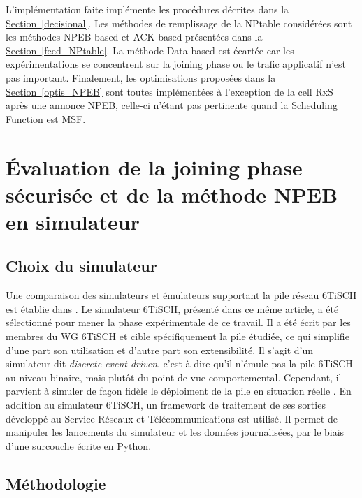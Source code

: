 \documentclass[]{report}
\newcommand{\wordlink}[2]{\hyperref[#2]{#1~\ref{#2}}}
\begin{document}
L'implémentation faite implémente les procédures décrites dans la \wordlink{Section}{decisional}. Les méthodes de remplissage de la NPtable considérées sont les méthodes NPEB-based et ACK-based présentées dans la \wordlink{Section}{feed_NPtable}. La méthode Data-based est écartée car les expérimentations se concentrent sur la joining phase ou le trafic applicatif n'est pas important. Finalement, les optimisations proposées dans la \wordlink{Section}{optis_NPEB} sont toutes implémentées à l'exception de la cell RxS après une annonce NPEB, celle-ci n'étant pas pertinente quand la Scheduling Function est MSF.


\chapter{Évaluation de la joining phase sécurisée et de la méthode NPEB en simulateur}
\label{chap_exp}
\newpage

\section{Choix du simulateur}
\label{choice_sim}

Une comparaison des simulateurs et émulateurs supportant la pile réseau 6TiSCH est établie dans \cite{simulating-6TiSCH}. Le simulateur 6TiSCH, présenté dans ce même article, a été sélectionné pour mener la phase expérimentale de ce travail. Il a été écrit par les membres du WG 6TiSCH et cible spécifiquement la pile étudiée, ce qui simplifie d'une part son utilisation et d'autre part son extensibilité. Il s'agit d'un simulateur dit \textit{discrete event-driven}, c'est-à-dire qu'il n'émule pas la pile 6TiSCH au niveau binaire, mais plutôt du point de vue comportemental. Cependant, il parvient à simuler de façon fidèle le déploiment de la pile en situation réelle \cite{simulating-6TiSCH}. En addition au simulateur 6TiSCH, un framework de traitement de ses sorties développé au Service Réseaux et Télécommunications est utilisé. Il permet de manipuler les lancements du simulateur et les données journalisées, par le biais d'une surcouche écrite en Python.

\section{Méthodologie}
\end{document}
